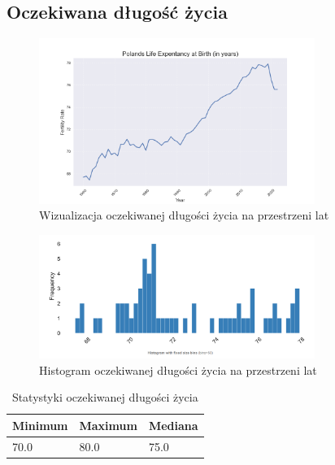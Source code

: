 \documentclass[11pt]{article}
\begin{document}
\subsection*{Oczekiwana długość życia}
\begin{figure}[H]
        \centering
        \includegraphics[width=0.8\textwidth]{polish_life_expentancy.png}
        \caption{Wizualizacja oczekiwanej długości życia na przestrzeni lat}
\end{figure}
\begin{figure}[H]
        \centering
        \includegraphics[width=0.8\textwidth]{images/histogram_dl_zycia.png}
        \caption{Histogram oczekiwanej długości życia na przestrzeni lat}
\end{figure}
\begin{table}[H]
        \centering
        \begin{tabular}{|l|l|l|}
        \hline
        Minimum & Maximum & Mediana \\ \hline
        70.0 & 80.0 & 75.0 \\ \hline
        \end{tabular}
        \caption{Statystyki oczekiwanej długości życia}
        \end{table}
\end{document}
